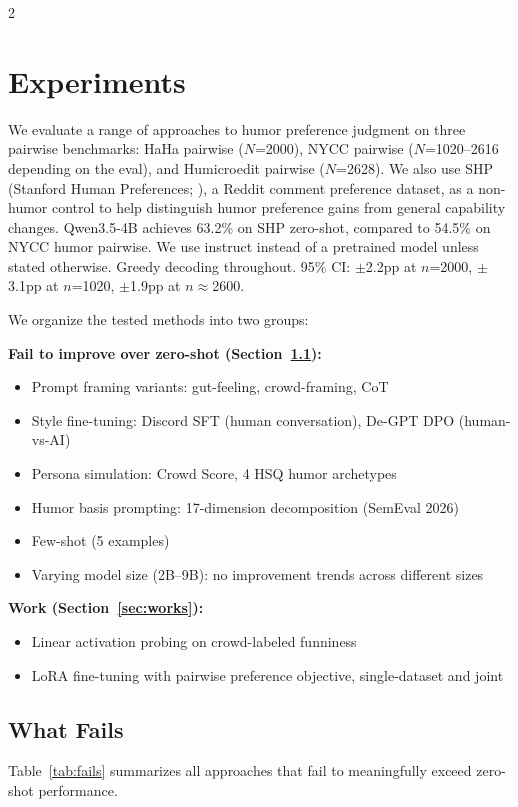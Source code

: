 \documentclass[10pt, a4paper]{article}
\begin{document}
\begin{multicols}{2}
\section{Experiments}

We evaluate a range of approaches to humor preference judgment on three pairwise benchmarks: HaHa pairwise ($N$=2000), NYCC pairwise ($N$=1020--2616 depending on the eval), and Humicroedit pairwise ($N$=2628). We also use SHP (Stanford Human Preferences; \cite{ethayarajh2022}), a Reddit comment preference dataset, as a non-humor control to help distinguish humor preference gains from general capability changes. Qwen3.5-4B achieves 63.2\% on SHP zero-shot, compared to 54.5\% on NYCC humor pairwise. We use instruct instead of a pretrained model unless stated otherwise. Greedy decoding throughout. 95\% CI: $\pm$2.2pp at $n$=2000, $\pm$3.1pp at $n$=1020, $\pm$1.9pp at $n$$\approx$2600.

We organize the tested methods into two groups:

\textbf{Fail to improve over zero-shot (Section~\ref{sec:fails}):}
\begin{itemize}\setlength\itemsep{0pt}
  \item Prompt framing variants: gut-feeling, crowd-framing, CoT
  \item Style fine-tuning: Discord SFT (human conversation), De-GPT DPO (human-vs-AI)
  \item Persona simulation: Crowd Score, 4 HSQ humor archetypes \cite{goes2022}
  \item Humor basis prompting: 17-dimension decomposition (SemEval 2026)
  \item Few-shot (5 examples)
  \item Varying model size (2B--9B): no improvement trends across different sizes
\end{itemize}

\textbf{Work (Section~\ref{sec:works}):}
\begin{itemize}\setlength\itemsep{0pt}
  \item Linear activation probing on crowd-labeled funniness
  \item LoRA fine-tuning with pairwise preference objective, single-dataset and joint
\end{itemize}

\subsection{What Fails}
\label{sec:fails}

Table~\ref{tab:fails} summarizes all approaches that fail to meaningfully exceed zero-shot performance.

\end{multicols}
\end{document}
